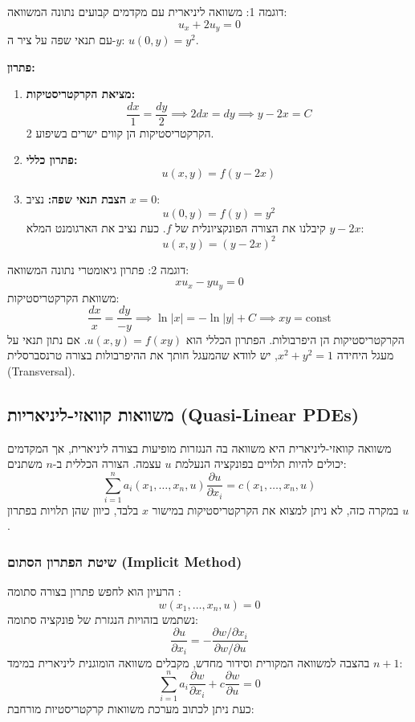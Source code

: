 \begin{examplebox}{דוגמה 1: משוואה ליניארית עם מקדמים קבועים}
נתונה המשוואה:
\[ u_x + 2u_y = 0 \]
עם תנאי שפה על ציר ה-$y$: $u(0,y) = y^2$.

\textbf{פתרון:}
\begin{enumerate}
    \item \textbf{מציאת הקרקטריסטיקות:}
    \[ \frac{dx}{1} = \frac{dy}{2} \implies 2dx = dy \implies y - 2x = C \]
    הקרקטריסטיקות הן קווים ישרים בשיפוע 2.
    \item \textbf{פתרון כללי:}
    \[ u(x,y) = f(y - 2x) \]
    \item \textbf{הצבת תנאי שפה:}
    נציב $x=0$:
    \[ u(0,y) = f(y) = y^2 \]
    קיבלנו את הצורה הפונקציונלית של $f$. כעת נציב את הארגומנט המלא $y-2x$:
    \[ u(x,y) = (y - 2x)^2 \]
\end{enumerate}
\end{examplebox}

\begin{examplebox}{דוגמה 2: פתרון גיאומטרי}
נתונה המשוואה:
\[ x u_x - y u_y = 0 \]
משוואת הקרקטריסטיקות:
\[ \frac{dx}{x} = \frac{dy}{-y} \implies \ln|x| = -\ln|y| + C \implies xy = \text{const} \]
הקרקטריסטיקות הן היפרבולות. הפתרון הכללי הוא $u(x,y) = f(xy)$.
אם נתון תנאי על מעגל היחידה $x^2+y^2=1$, יש לוודא שהמעגל חותך את ההיפרבולות בצורה טרנסברסלית (Transversal).
\end{examplebox}

\subsection{משוואות קוואזי-ליניאריות (Quasi-Linear PDEs)}

משוואה קוואזי-ליניארית היא משוואה בה הנגזרות מופיעות בצורה ליניארית, אך המקדמים יכולים להיות תלויים בפונקציה הנעלמת $u$ עצמה. הצורה הכללית ב-$n$ משתנים:
\[
\sum_{i=1}^n a_i(x_1, \dots, x_n, u) \frac{\partial u}{\partial x_i} = c(x_1, \dots, x_n, u)
\]
במקרה כזה, לא ניתן למצוא את הקרקטריסטיקות במישור $x$ בלבד, כיוון שהן תלויות בפתרון $u$.

\subsubsection{שיטת הפתרון הסתום (Implicit Method)}
הרעיון הוא לחפש פתרון בצורה סתומה :
\[ w(x_1, \dots, x_n, u) = 0 \]
נשתמש בזהויות הנגזרת של פונקציה סתומה:
\[ \frac{\partial u}{\partial x_i} = - \frac{\partial w / \partial x_i}{\partial w / \partial u} \]
בהצבה למשוואה המקורית וסידור מחדש, מקבלים משוואה הומוגנית ליניארית במימד $n+1$:
\[
\sum_{i=1}^n a_i \frac{\partial w}{\partial x_i} + c \frac{\partial w}{\partial u} = 0
\]
כעת ניתן לכתוב מערכת משוואות קרקטריסטיות מורחבת:

